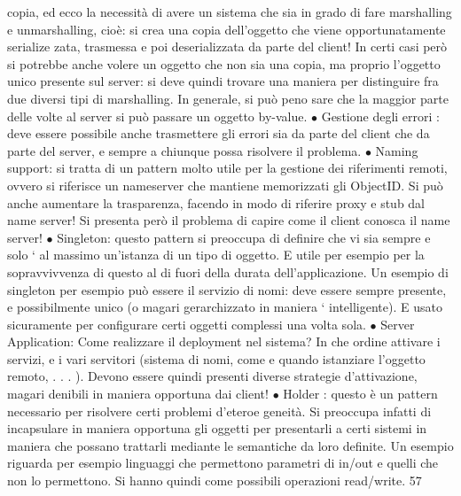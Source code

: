 copia, ed ecco la necessità
di avere un sistema che sia in grado di fare marshalling e unmarshalling,
cioè: si crea una copia dell'oggetto che viene opportunatamente serialize
zata, trasmessa e poi deserializzata da parte del client! In certi casi però
si potrebbe anche volere un oggetto che non sia una copia, ma proprio
l'oggetto unico presente sul server: si deve quindi trovare una maniera per
distinguire fra due diversi tipi di marshalling. In generale, si può peno
sare che la maggior parte delle volte al server si può passare un oggetto
by-value.
$\bullet$ Gestione degli errori : deve essere possibile anche trasmettere gli errori
sia da parte del client che da parte del server, e sempre a chiunque possa
risolvere il problema.
$\bullet$ Naming support: si tratta di un pattern molto utile per la gestione dei
riferimenti remoti, ovvero si riferisce un nameserver che mantiene memorizzati gli ObjectID. Si può anche aumentare la
trasparenza, facendo in
modo di riferire proxy e stub dal name server! Si presenta però il problema
di capire come il client conosca il name server!
$\bullet$ Singleton: questo pattern si preoccupa di definire che vi sia sempre e solo
`
al massimo un'istanza di un tipo di oggetto. E utile per esempio per
la sopravvivvenza di questo al di fuori della durata dell'applicazione. Un
esempio di singleton per esempio può essere il servizio di nomi: deve essere
sempre presente, e possibilmente unico (o magari gerarchizzato in maniera
`
intelligente). E usato sicuramente per configurare certi oggetti complessi
una volta sola.
$\bullet$ Server Application: Come realizzare il deployment nel sistema? In che
ordine attivare i servizi, e i vari servitori (sistema di nomi, come e quando
istanziare l'oggetto remoto, . . . ). Devono essere quindi presenti diverse
strategie d'attivazione, magari denibili in maniera opportuna dai client!
$\bullet$ Holder : questo è un pattern necessario per risolvere certi problemi d'eteroe
geneità. Si preoccupa infatti di incapsulare in maniera opportuna gli
oggetti per presentarli a certi sistemi in maniera che possano trattarli
mediante le semantiche da loro definite. Un esempio riguarda per esempio linguaggi che permettono parametri di in/out e
quelli che non lo
permettono. Si hanno quindi come possibili operazioni read/write.
57
